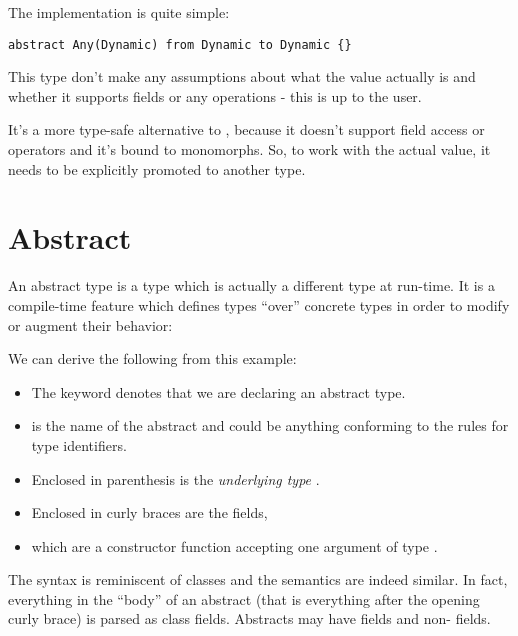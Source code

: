The implementation is quite simple:

\begin{lstlisting}
abstract Any(Dynamic) from Dynamic to Dynamic {}
\end{lstlisting}

This type don't make any assumptions about what the value actually is and whether it supports fields or any operations - this is up to the user.


It's a more type-safe alternative to , because it doesn't support field access or operators and it's bound to monomorphs. So, to work with the actual value, it needs to be explicitly promoted to another type.



\section{Abstract}
\label{types-abstract}

An abstract type is a type which is actually a different type at run-time. It is a compile-time feature which defines types ``over'' concrete types in order to modify or augment their behavior:

We can derive the following from this example:

\begin{itemize}
	\item The keyword  denotes that we are declaring an abstract type.
	\item {} is the name of the abstract and could be anything conforming to the rules for type identifiers.
	\item Enclosed in parenthesis \expr{()} is the \emph{underlying type} .
	\item Enclosed in curly braces \expr{$\left\{\right\}$} are the fields,
	\item which are a constructor function  accepting one argument  of type .
\end{itemize}


The syntax is reminiscent of classes and the semantics are indeed similar. In fact, everything in the ``body'' of an abstract (that is everything after the opening curly brace) is parsed as class fields. Abstracts may have  fields and non-  fields.


